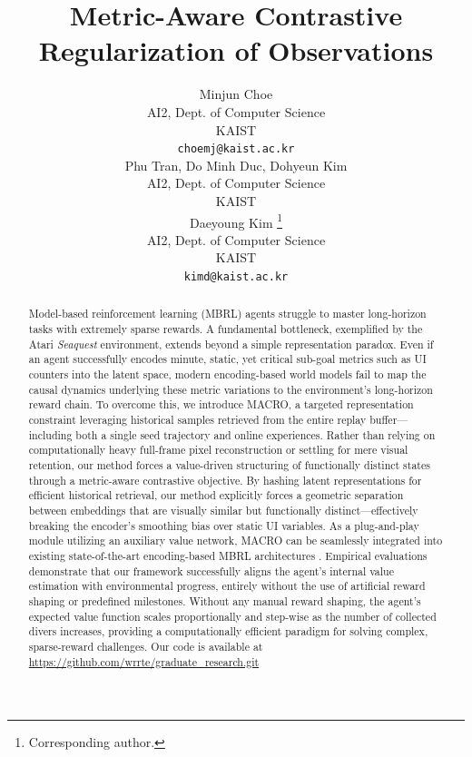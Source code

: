 \documentclass{article} %
\title{Metric-Aware Contrastive Regularization of Observations}
\author{Minjun Choe \\
AI2, Dept. of Computer Science \\
KAIST \\
\texttt{choemj@kaist.ac.kr} \\
\And
Phu Tran, Do Minh Duc, Dohyeun Kim \\ 
AI2, Dept. of Computer Science \\
KAIST \\
\And
Daeyoung Kim \thanks{Corresponding author.} \\ 
AI2, Dept. of Computer Science \\
KAIST \\
\texttt{kimd@kaist.ac.kr}
}
\begin{document}
\maketitle

\begin{abstract}
Model-based reinforcement learning (MBRL) agents struggle to master long-horizon tasks with extremely sparse rewards. A fundamental bottleneck, exemplified by the Atari \textit{Seaquest} environment, extends beyond a simple representation paradox. Even if an agent successfully encodes minute, static, yet critical sub-goal metrics such as UI counters into the latent space, modern encoding-based world models fail to map the causal dynamics underlying these metric variations to the environment's long-horizon reward chain. To overcome this, we introduce MACRO, a targeted representation constraint leveraging historical samples retrieved from the entire replay buffer—including both a single seed trajectory and online experiences. Rather than relying on computationally heavy full-frame pixel reconstruction or settling for mere visual retention, our method forces a value-driven structuring of functionally distinct states through a metric-aware contrastive objective. By hashing latent representations for efficient historical retrieval, our method explicitly forces a geometric separation between embeddings that are visually similar but functionally distinct—effectively breaking the encoder's smoothing bias over static UI variables. As a plug-and-play module utilizing an auxiliary value network, MACRO can be seamlessly integrated into existing state-of-the-art encoding-based MBRL architectures \citep[e.g., DreamerV3, STORM, DRAMA;][]{hafner2025mastering, zhang2023storm, wang2025drama}. Empirical evaluations demonstrate that our framework successfully aligns the agent’s internal value estimation with environmental progress, entirely without the use of artificial reward shaping or predefined milestones. Without any manual reward shaping, the agent's expected value function scales proportionally and step-wise as the number of collected divers increases, providing a computationally efficient paradigm for solving complex, sparse-reward challenges. Our code is available at \url{https://github.com/wrrte/graduate_research.git}
\end{abstract}
\end{document}
